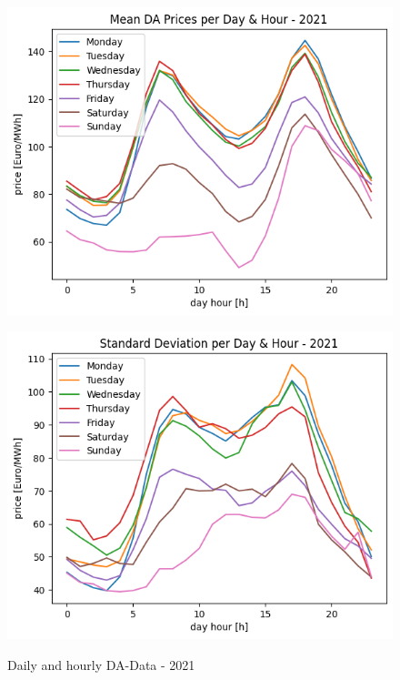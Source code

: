 \begin{figure}[h!]
	\centering
	\begin{minipage}{0.49\textwidth}
		\includegraphics[width=1\linewidth]{pictures/DA/Mean DA Prices per Day and Hour - 2021.png}
		\label{fig:meanDA2021}
	\end{minipage} \hfill
	\begin{minipage}{0.49\textwidth}
		\includegraphics[width=1\linewidth]{pictures/DA/Standard Deviation per Day and Hour - 2021.png}
		\label{fig:stdDA2021}
	\end{minipage}
	\caption{Daily and hourly DA-Data - 2021 }
\end{figure}

